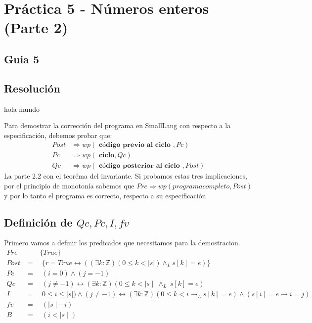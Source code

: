 \documentclass[12pt]{book}
\begin{document}
\chapter{Práctica 5 - Números enteros (Parte 2)}
\section{Guia 5}



\section{Resoluci\'on}


hola mundo














\begin{shaded}
Para demostrar la corrección del programa en SmallLang con respecto a la especificación, debemos probar que:
\begin{align}
Post &\Rightarrow wp( \textbf{ c\'odigo previo al ciclo } , Pc) \\
Pc &\Rightarrow wp (\textbf{ ciclo}, Qc ) \\
Qc & \Rightarrow wp ( \textbf{ c\'odigo posterior al ciclo }, Post) 
\end{align}
La parte 2.2 con el teor\'ema del invariante. Si probamos estas tres implicaciones, por el principio de monoton\'ia sabemos que  $ Pre \Rightarrow wp(  programa completo  , Post)  $  y por lo tanto el programa  es correcto, respecto a su especificaci\'on
\end{shaded}

\section{Definici\'on de $ Qc, Pc, I, fv$}
Primero vamos a definir los predicados que necesitamos para la demostracion.
\begin{align*}
Pre & \quad \quad \{ True \}  \\
Post &= \quad \{ r = True \leftrightarrow ((\exists k :\mathbb{Z})(0 \leq k < |s|) \wedge_L s[k] = e)\} \\
Pc &= \quad (i = 0) \wedge (j = -1) \\
Qc &=  \quad(j \neq -1) \leftrightarrow (\exists k : \mathbb{Z})(0 \leq k < \mid s\mid \ \wedge_{L} \ s[k] = e) \\
I &= \quad 0 \leq i \leq  \mid s \mid) \wedge (j \neq -1) \leftrightarrow (\exists k : \mathbb{Z})(0 \leq k < i \rightarrow_L s[k] = e) \wedge (s[i] = e \rightarrow i = j)  \\
fv &= \quad ( \mid s \mid - i )\\
B &= \quad (i < \mid s \mid)
\end{align*}
\end{document}

